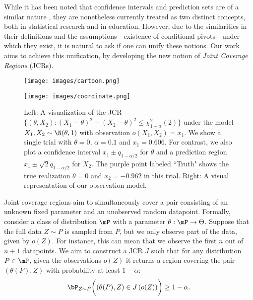 \documentclass[english]{article}
\begin{document}
While it has been noted that confidence intervals and prediction sets are of a similar nature \citep[e.g.,][p. 482]{shao2003mathematical}, 
they are nonetheless currently treated as two distinct concepts, both in statistical research and in education.
However, due to the similarities in their definitions and the assumptions---existence of conditional pivots---under which they exist, it is natural to ask if  one can unify these notions. 
Our work aims to achieve this unification, 
by developing the new notion of \emph{Joint Coverage Regions} (JCRs).


\begin{figure}
\begin{minipage}[ht]{0.5\linewidth}
\centering
    \texttt{[image: images/cartoon.png]}
    \end{minipage}
\begin{minipage}[ht]{0.5\linewidth}
   \centering
    \texttt{[image: images/coordinate.png]}
    \end{minipage}
\caption{Left:  A visualization of the JCR $\{(\theta,X_2):(X_1-\theta)^2+(X_2-\theta)^2 \leq \chi_{1-\alpha}^2(2)\}$ under the model $X_1,X_2 \sim \N(\theta,1)$ with observation $o(X_1,X_2)=x_1$. We show a single trial with $\theta = 0$, $\alpha = 0.1$ and $x_1=0.606$. For contrast, we also plot a confidence interval $x_1 \pm q_{1-\alpha/2}$ for $\theta$ and a prediction region $x_1 \pm \sqrt{2}q_{1-\alpha/2}$ for $X_2$. The purple point labeled ``Truth" shows the true realization $\theta=0$ and $x_2 = -0.962$ in this trial.
Right: A visual representation of our observation model.}
\label{fig:coordinate}
\end{figure}

Joint coverage regions aim to simultaneously cover a pair consisting of an unknown fixed parameter and an unobserved random datapoint.
Formally, consider a class of distribution $\mP$ with a parameter $\theta: \mP \rightarrow \Theta$.
Suppose that the full data $Z\sim P$ is sampled from $P$, but we only observe part of the data, given by $o(Z)$. 
For instance, this can mean that we observe the first $n$ out of $n+1$ datapoints.
We aim to construct a JCR $J$ such that for any distribution $P \in \mP$,
given the observations $o(Z)$ it returns a region covering the pair $\left(\theta(P), Z\right)$ with probability at least  $1-\alpha$:
$$\bP_{Z \sim P}\biggl(\left(\theta(P), Z\right) \in J\left( o(Z)\right)\biggr) \ge 1 - \alpha.$$
\end{document}
